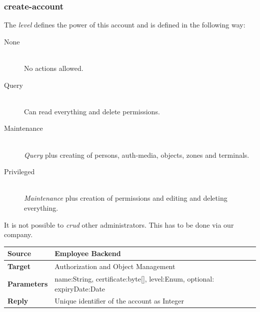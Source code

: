 \documentclass[12pt,a4paper,titlepage,oneside]{scrartcl}
\begin{document}
\subsubsection{create-account}

The \emph{level} defines the power of this account and is defined in the following way:

\begin{description}

  \item[None] \hfill \\

  No actions allowed.

  \item[Query] \hfill \\

  Can read everything and delete permissions.

  \item[Maintenance] \hfill \\

  \emph{Query} plus creating of persons, auth-media, objects, zones and terminals.

  \item[Privileged] \hfill \\

  \emph{Maintenance} plus creation of permissions and editing and deleting everything.

\end{description}

It is not possible to \emph{crud} other administrators. This has to be done via our company.

\begin{table}[h]

    \centering

    \begin{tabular}{|l|p{12cm}|} \hline

    \textbf{Source}&Employee Backend\\ \hline

    \textbf{Target}&Authorization and Object Management\\ \hline

    \textbf{Parameters}&name:String, certificate:byte[], level:Enum, optional: expiryDate:Date\\ \hline

    \textbf{Reply}&Unique identifier of the account as Integer\\ \hline

    \end{tabular}

\end{table}
\end{document}
